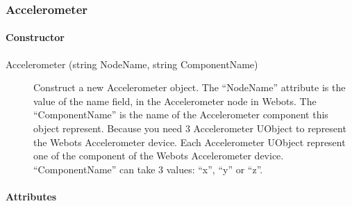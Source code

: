 \subsubsection{Accelerometer}
\label{webots.uobjects.robotdevices.accelerometer}%

\paragraph{Constructor}
\label{webots.uobjects.robotdevices.accelerometer.constructor}%

\noindent
\begin{description}
\item[{Accelerometer (string NodeName, string ComponentName)}]
  Construct a new Accelerometer object.  The ``NodeName'' attribute is
  the value of the name field, in the Accelerometer node in Webots.
  The ``ComponentName'' is the name of the Accelerometer component this
  object represent.  Because you need 3 Accelerometer UObject to
  represent the Webots Accelerometer device. Each Accelerometer
  UObject represent one of the component of the Webots Accelerometer
  device.  ``ComponentName'' can take 3 values: ``x'', ``y'' or ``z''.

\end{description}

\paragraph{Attributes}
\label{webots.uobjects.robotdevices.accelerometer.attributes}%

